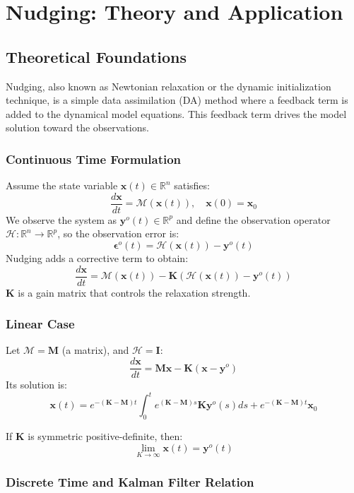 
\section{Nudging: Theory and Application}

\subsection{Theoretical Foundations}

Nudging, also known as Newtonian relaxation or the dynamic initialization technique, is a simple data assimilation (DA) method where a feedback term is added to the dynamical model equations. This feedback term drives the model solution toward the observations.

\subsubsection*{Continuous Time Formulation}

Assume the state variable $\mathbf{x}(t) \in \mathbb{R}^n$ satisfies:
\[
\frac{d\mathbf{x}}{dt} = \mathcal{M}(\mathbf{x}(t)), \quad \mathbf{x}(0) = \mathbf{x}_0
\]
We observe the system as $\mathbf{y}^{o}(t) \in \mathbb{R}^p$ and define the observation operator $\mathcal{H} : \mathbb{R}^n \to \mathbb{R}^p$, so the observation error is:
\[
\boldsymbol{\epsilon}^o(t) = \mathcal{H}(\mathbf{x}(t)) - \mathbf{y}^{o}(t)
\]
Nudging adds a corrective term to obtain:
\[
\frac{d\mathbf{x}}{dt} = \mathcal{M}(\mathbf{x}(t)) - \mathbf{K}(\mathcal{H}(\mathbf{x}(t)) - \mathbf{y}^{o}(t))
\]
$\mathbf{K}$ is a gain matrix that controls the relaxation strength.

\subsubsection*{Linear Case}

Let $\mathcal{M} = \mathbf{M}$ (a matrix), and $\mathcal{H} = \mathbf{I}$:
\[
\frac{d\mathbf{x}}{dt} = \mathbf{M} \mathbf{x} - \mathbf{K} (\mathbf{x} - \mathbf{y}^o)
\]
Its solution is:
\[
\mathbf{x}(t) = e^{-(\mathbf{K} - \mathbf{M})t} \int_0^t e^{(\mathbf{K} - \mathbf{M})s} \mathbf{K} \mathbf{y}^o(s) ds + e^{-(\mathbf{K} - \mathbf{M})t} \mathbf{x}_0
\]

If $\mathbf{K}$ is symmetric positive-definite, then:
\[
\lim_{K \to \infty} \mathbf{x}(t) = \mathbf{y}^o(t)
\]

\subsubsection*{Discrete Time and Kalman Filter Relation}

